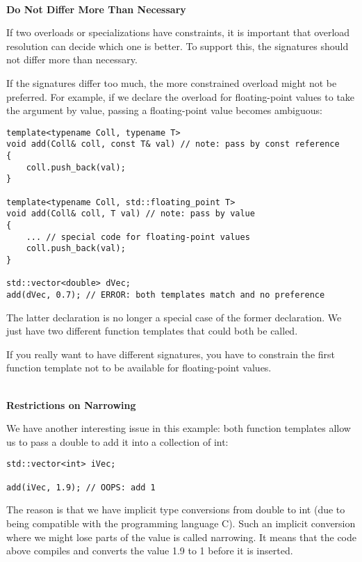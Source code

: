 \noindent
\hspace*{\fill} \\ %
\textbf{Do Not Differ More Than Necessary}

If two overloads or specializations have constraints, it is important that overload resolution can decide which one is better. To support this, the signatures should not differ more than necessary.

If the signatures differ too much, the more constrained overload might not be preferred. For example, if we declare the overload for floating-point values to take the argument by value, passing a floating-point value becomes ambiguous:

\begin{lstlisting}[style=styleCXX]
template<typename Coll, typename T>
void add(Coll& coll, const T& val) // note: pass by const reference
{
	coll.push_back(val);
}

template<typename Coll, std::floating_point T>
void add(Coll& coll, T val) // note: pass by value
{
	... // special code for floating-point values
	coll.push_back(val);
}

std::vector<double> dVec;
add(dVec, 0.7); // ERROR: both templates match and no preference
\end{lstlisting}

The latter declaration is no longer a special case of the former declaration. We just have two different function templates that could both be called.

If you really want to have different signatures, you have to constrain the first function template not to be available for floating-point values.

\noindent
\hspace*{\fill} \\ %
\textbf{Restrictions on Narrowing}

We have another interesting issue in this example: both function templates allow us to pass a double to add it into a collection of int:

\begin{lstlisting}[style=styleCXX]
std::vector<int> iVec;

add(iVec, 1.9); // OOPS: add 1
\end{lstlisting}

The reason is that we have implicit type conversions from double to int (due to being compatible with the programming language C). Such an implicit conversion where we might lose parts of the value is called narrowing. It means that the code above compiles and converts the value 1.9 to 1 before it is inserted.

